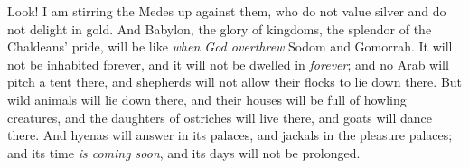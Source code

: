\begin{biblechapter}
\verse Look! I am stirring the Medes up against them, 
who do not value silver 
and do not delight in gold.
\verse And Babylon, the glory of kingdoms, the splendor of the Chaldeans’ pride, will be like \textit{when God overthrew} Sodom and Gomorrah.
\verse It will not be inhabited forever, 
and it will not be dwelled in \textit{forever}; 
and no Arab will pitch a tent there, 
and shepherds will not allow their flocks to lie down there.
\verse But wild animals will lie down there, 
and their houses will be full of howling creatures, 
and the daughters of ostriches will live there, 
and goats will dance there.
\verse And hyenas will answer in its palaces, 
and jackals in the pleasure palaces; 
and its time \textit{is coming soon}, 
and its days will not be prolonged.
\end{biblechapter}

